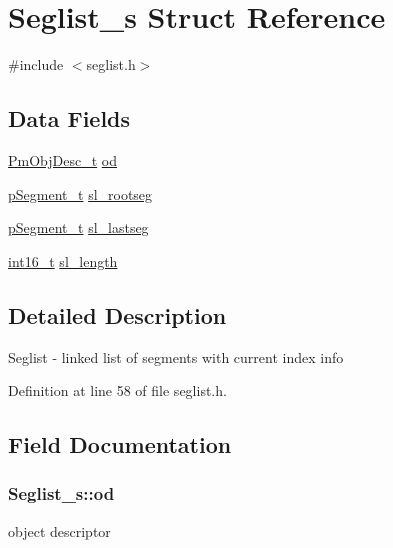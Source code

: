 \hypertarget{struct_seglist__s}{\section{Seglist\-\_\-s Struct Reference}
\label{struct_seglist__s}
}


{\ttfamily \#include $<$seglist.\-h$>$}

\subsection*{Data Fields}
\begin{DoxyCompactItemize}
\item 
\hyperlink{obj_8h_a72d816790acd8eb550fb25268c2b3489}{Pm\-Obj\-Desc\-\_\-t} \hyperlink{struct_seglist__s_a4ec3fa9c4391a057c66abc38a5cc5c0b}{od}
\item 
\hyperlink{seglist_8h_a786b6287d5f6dbdffef1e551c215bbee}{p\-Segment\-\_\-t} \hyperlink{struct_seglist__s_a529a3a7582171652fa4b604aee594b3a}{sl\-\_\-rootseg}
\item 
\hyperlink{seglist_8h_a786b6287d5f6dbdffef1e551c215bbee}{p\-Segment\-\_\-t} \hyperlink{struct_seglist__s_a88b2cd37360813049df23bc0e7db51d1}{sl\-\_\-lastseg}
\item 
\hyperlink{stdint_8h_aa343fa3b3d06292b959ffdd4c4703b06}{int16\-\_\-t} \hyperlink{struct_seglist__s_a8b7bb21187d3d23e12a68712f388dfd8}{sl\-\_\-length}
\end{DoxyCompactItemize}


\subsection{Detailed Description}
Seglist -\/ linked list of segments with current index info 

Definition at line 58 of file seglist.\-h.



\subsection{Field Documentation}
\hypertarget{struct_seglist__s_a4ec3fa9c4391a057c66abc38a5cc5c0b}{
\subsubsection[{od}]{ Seglist\-\_\-s\-::od}}\label{struct_seglist__s_a4ec3fa9c4391a057c66abc38a5cc5c0b}
object descriptor 

